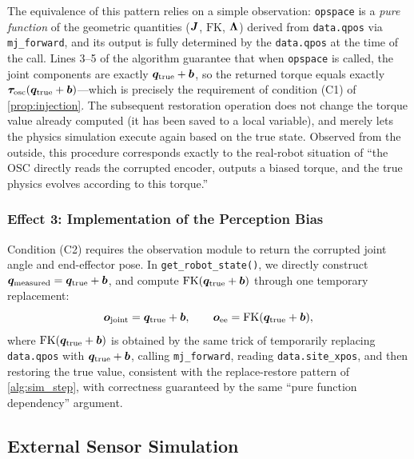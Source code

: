 The equivalence of this pattern relies on a simple observation: \texttt{opspace} is a \emph{pure function} of the geometric quantities ($\bm{J}$, $\text{FK}$, $\bm{\Lambda}$) derived from \texttt{data.qpos} via \texttt{mj\_forward}, and its output is fully determined by the \texttt{data.qpos} at the time of the call. Lines 3--5 of the algorithm guarantee that when \texttt{opspace} is called, the joint components are exactly $\bm{q}_{\text{true}} + \bm{b}$, so the returned torque equals exactly $\bm{\tau}_{\text{osc}}(\bm{q}_{\text{true}} + \bm{b})$---which is precisely the requirement of condition (C1) of \cref{prop:injection}. The subsequent restoration operation does not change the torque value already computed (it has been saved to a local variable), and merely lets the physics simulation execute again based on the true state. Observed from the outside, this procedure corresponds exactly to the real-robot situation of ``the OSC directly reads the corrupted encoder, outputs a biased torque, and the true physics evolves according to this torque.''

\subsubsection*{Effect 3: Implementation of the Perception Bias}\label{subsec:sim_effect3}

Condition (C2) requires the observation module to return the corrupted joint angle and end-effector pose. In \texttt{get\_robot\_state()}, we directly construct $\bm{q}_{\text{measured}} = \bm{q}_{\text{true}} + \bm{b}$, and compute $\text{FK}(\bm{q}_{\text{true}} + \bm{b})$ through one temporary replacement:
\begin{equation}
  \bm{o}_{\text{joint}} = \bm{q}_{\text{true}} + \bm{b}, \qquad
  \bm{o}_{\text{ee}} = \text{FK}(\bm{q}_{\text{true}} + \bm{b}),
  \label{eq:sim_obs}
\end{equation}
where $\text{FK}(\bm{q}_{\text{true}} + \bm{b})$ is obtained by the same trick of temporarily replacing \texttt{data.qpos} with $\bm{q}_{\text{true}} + \bm{b}$, calling \texttt{mj\_forward}, reading \texttt{data.site\_xpos}, and then restoring the true value, consistent with the replace-restore pattern of \cref{alg:sim_step}, with correctness guaranteed by the same ``pure function dependency'' argument.

\subsection{External Sensor Simulation}\label{subsec:sim_external}

